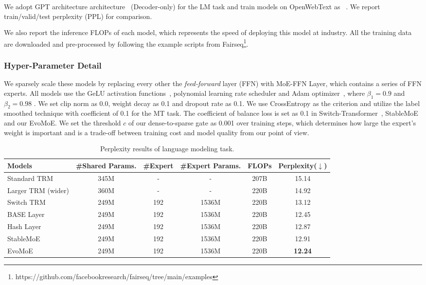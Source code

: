 We adopt GPT architecture architecture~\cite{gpt2} (Decoder-only) 
for the LM task and train models on OpenWebText as ~\citet{gpt2}. We report train/valid/test perplexity (PPL) for comparison.

We also report the inference FLOPs of each model, which represents the speed of deploying this model at industry. All the training data are downloaded and pre-processed by following the example scripts from Fairseq\footnote{https://github.com/facebookresearch/fairseq/tree/main/examples}.

\subsubsection{Hyper-Parameter Detail}
We sparsely scale these models by replacing every other the \textit{feed-forward} layer (FFN) with MoE-FFN Layer, which contains a series of FFN experts.
All models use the GeLU activation functions~\cite{gelu_activation}, polynomial learning rate scheduler and Adam optimizer~\cite{DBLP:journals/corr/adam_optim}, where $\beta_1 = 0.9$ and $\beta_2 = 0.98$ . 
We set clip norm as 0.0, weight decay as 0.1 and dropout rate as 0.1.
We use CrossEntropy as the criterion and utilize the label smoothed technique with coefficient of 0.1 for the MT task.  
The coefficient of balance loss is set as 0.1 in Switch-Transformer~\cite{DBLP:switch}, StableMoE~\cite{DBLP:conf/acl/stablemoe} and our EvoMoE.
We set the threshold $c$ of our dense-to-sparse gate as 0.001 over training steps, which determines how large the expert's weight is important and is a trade-off between training cost and model quality from our point of view. 

\begin{table*}[t]
    \caption{Perplexity results of language modeling task.}
        \begin{center}
            \begin{tabular}{l|cccc|c}
            \toprule 
            \textbf{Models}  & \textbf{\#Shared Params.} &  \textbf{\#Expert}& \textbf{\#Expert Params.} & \textbf{FLOPs} & 
            \textbf{Perplexity($\downarrow$)}  \\
            \midrule
            Standard TRM&  345M& -  & -  & 207B& 15.14\\
            Larger TRM (wider)& 360M & - & - & 220B& 14.92\\
            \midrule
            Switch TRM & 249M& 192& 1536M& 220B& 13.12\\
            BASE Layer & 249M& 192& 1536M& 220B& 12.45\\
            Hash Layer& 249M& 192& 1536M& 220B& 12.87\\
            StableMoE & 249M& 192& 1536M&220B & 12.91\\
            EvoMoE & 249M& 192& 1536M& 220B& \textbf{12.24}\\
            \bottomrule
            \end{tabular}
        \end{center}
\label{tab:gpt_lm}
\end{table*}


